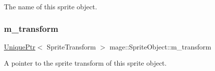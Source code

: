 The name of this sprite object. \hypertarget{classmage_1_1_sprite_object_a9523ae6f081a8fde3cbb3558f6e327da}{}\label{classmage_1_1_sprite_object_a9523ae6f081a8fde3cbb3558f6e327da} 
\subsubsection{\texorpdfstring{m\+\_\+transform}{m\_transform}}
{\footnotesize\ttfamily \hyperlink{namespacemage_a8c307fbcc33bce9b7f2aa4c26c3b95cf}{Unique\+Ptr}$<$ Sprite\+Transform $>$ mage\+::\+Sprite\+Object\+::m\+\_\+transform\hspace{0.3cm}{\ttfamily [private]}}

A pointer to the sprite transform of this sprite object. 